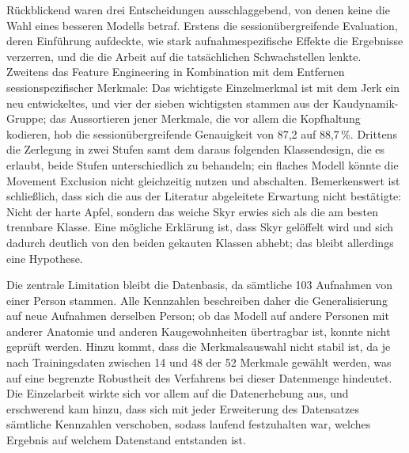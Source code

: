 \documentclass[11pt]{article}
\begin{document}
Rückblickend waren drei Entscheidungen ausschlaggebend, von denen keine die Wahl eines
besseren Modells betraf. Erstens die sessionübergreifende Evaluation, deren Einführung
aufdeckte, wie stark aufnahmespezifische Effekte die Ergebnisse verzerren, und die die
Arbeit auf die tatsächlichen Schwachstellen lenkte. Zweitens das Feature Engineering in
Kombination mit dem Entfernen sessionspezifischer Merkmale: Das wichtigste Einzelmerkmal
ist mit dem Jerk ein neu entwickeltes, und vier der sieben wichtigsten stammen aus der
Kaudynamik-Gruppe; das Aussortieren jener Merkmale, die vor allem die Kopfhaltung
kodieren, hob die sessionübergreifende Genauigkeit von 87,2 auf 88,7\,\%.
Drittens die Zerlegung in zwei Stufen samt dem daraus folgenden Klassendesign, die es
erlaubt, beide Stufen unterschiedlich zu behandeln; ein flaches Modell könnte die Movement
Exclusion nicht gleichzeitig nutzen und abschalten. Bemerkenswert ist schließlich, dass
sich die aus der Literatur abgeleitete Erwartung nicht bestätigte: Nicht der harte Apfel,
sondern das weiche Skyr erwies sich als die am besten trennbare Klasse. Eine mögliche
Erklärung ist, dass Skyr gelöffelt wird und sich dadurch deutlich von den beiden gekauten
Klassen abhebt; das bleibt allerdings eine Hypothese.

Die zentrale Limitation bleibt die Datenbasis, da sämtliche 103 Aufnahmen von einer Person
stammen. Alle Kennzahlen beschreiben daher die Generalisierung auf neue Aufnahmen derselben
Person; ob das Modell auf andere Personen mit anderer Anatomie und anderen Kaugewohnheiten
übertragbar ist, konnte nicht geprüft werden. Hinzu kommt, dass die Merkmalsauswahl nicht
stabil ist, da je nach Trainingsdaten zwischen 14 und 48 der 52 Merkmale gewählt werden,
was auf eine begrenzte Robustheit des Verfahrens bei dieser Datenmenge hindeutet. Die
Einzelarbeit wirkte sich vor allem auf die Datenerhebung aus, und erschwerend kam hinzu,
dass sich mit jeder Erweiterung des Datensatzes sämtliche Kennzahlen verschoben, sodass
laufend festzuhalten war, welches Ergebnis auf welchem Datenstand entstanden ist.
\end{document}
